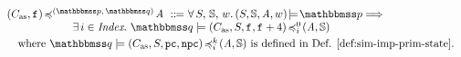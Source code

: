 \begin{definition}
    \em
    \label{def:simfunc}
    \small
    \[
        \begin{array}{l}
            \simFunction{(\asmimp, \lab{})}
                {(\relastP, \, \relastQ)}{\primcom}
            \ \define \ 
            \forall \, \state, \, \hpstate, \, \word. \,      
            \asrtmodel{(\state, \hpstate, \primcom, \word)}{\relastP}
            \Longrightarrow \\
            \hspace*{6em}
            \exists \, i \in \Index. \ 
            \simFunctionSt{\relastQ}{(\asmimp, \state, \lab{}, \lab{}+4)}
                {i}{0}{(\primcom, \hpstate)} \\
            \\[-9pt]
            \hspace*{1em}
            \text{where } 
            \simFunctionSt{\relastQ}{(\asmimp, \state, \pc, \npc)}
                {i}{k}{(\primcom, \hpstate)}
            \TYPE{ is defined in 
            \Def{\ref{def:sim-imp-prim-state}}}.
        \end{array}
    \] 
\end{definition}


